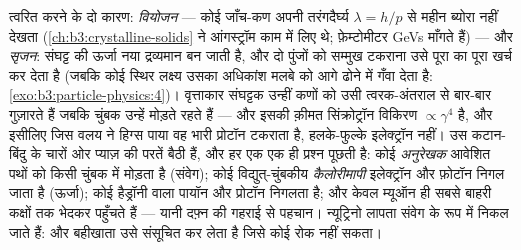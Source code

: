\begin{remark}[त्वरक और संसूचक]\label{rem:b3:particle-physics:machines}
त्वरित करने के दो कारण: \emph{वियोजन} --- कोई जाँच-कण अपनी
तरंगदैर्घ्य $\lambda = h/p$ से महीन ब्योरा नहीं देखता
(\cref{ch:b3:crystalline-solids} ने आंगस्ट्रॉम काम में लिए थे;
फ़ेम्टोमीटर \unit{GeV}s माँगते हैं) --- और \emph{सृजन}: संघट्ट की
ऊर्जा नया द्रव्यमान बन जाती है, और दो पुंजों को सम्मुख टकराना उसे
पूरा का पूरा खर्च कर देता है (जबकि कोई स्थिर लक्ष्य उसका अधिकांश
मलबे को आगे ढोने में गँवा देता है:
\cref{exo:b3:particle-physics:4})। वृत्ताकार संघट्टक उन्हीं कणों को
उसी त्वरक-अंतराल से बार-बार गुज़ारते हैं जबकि चुंबक उन्हें मोड़ते
रहते हैं --- और इसकी क़ीमत सिंक्रोट्रॉन विकिरण
$\propto\gamma^4$ है, और इसीलिए जिस वलय ने हिग्स पाया वह
भारी प्रोटॉन टकराता है, हलके-फुल्के इलेक्ट्रॉन नहीं। उस
कटान-बिंदु के चारों ओर प्याज़ की परतें बैठी हैं, और हर एक एक ही
प्रश्न पूछती है: कोई \emph{अनुरेखक} आवेशित पथों को किसी चुंबक में
मोड़ता है (संवेग); कोई विद्युत्-चुंबकीय \emph{कैलोरीमापी}
इलेक्ट्रॉन और फ़ोटॉन निगल जाता है (ऊर्जा); कोई हैड्रॉनी वाला
पायॉन और प्रोटॉन निगलता है; और केवल म्यूऑन ही सबसे बाहरी कक्षों तक
भेदकर पहुँचते हैं --- यानी दफ़्न की गहराई से पहचान। न्यूट्रिनो
लापता संवेग के रूप में निकल जाते हैं: और बहीखाता उसे संसूचित कर लेता
है जिसे कोई रोक नहीं सकता।
\end{remark}

